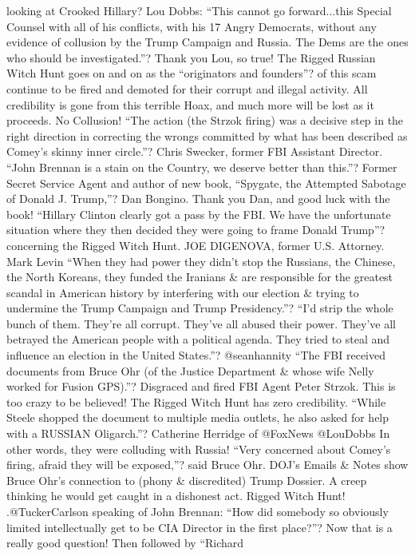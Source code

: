 looking at Crooked Hillary? Lou Dobbs: ``This cannot go forward...this
Special Counsel with all of his conflicts, with his 17 Angry Democrats,
without any evidence of collusion by the Trump Campaign and Russia. The
Dems are the ones who should be investigated.''? Thank you Lou, so true!
The Rigged Russian Witch Hunt goes on and on as the ``originators and
founders''? of this scam continue to be fired and demoted for their
corrupt and illegal activity. All credibility is gone from this terrible
Hoax, and much more will be lost as it proceeds. No Collusion! ``The
action (the Strzok firing) was a decisive step in the right direction in
correcting the wrongs committed by what has been described as Comey's
skinny inner circle.''? Chris Swecker, former FBI Assistant Director.
``John Brennan is a stain on the Country, we deserve better than
this.''? Former Secret Service Agent and author of new book, ``Spygate,
the Attempted Sabotage of Donald J. Trump,''? Dan Bongino. Thank you
Dan, and good luck with the book! ``Hillary Clinton clearly got a pass
by the FBI. We have the unfortunate situation where they then decided
they were going to frame Donald Trump''? concerning the Rigged Witch
Hunt. JOE DIGENOVA, former U.S. Attorney. Mark Levin ``When they had
power they didn't stop the Russians, the Chinese, the North Koreans,
they funded the Iranians \& are responsible for the greatest scandal in
American history by interfering with our election \& trying to undermine
the Trump Campaign and Trump Presidency.''? ``I'd strip the whole bunch
of them. They're all corrupt. They've all abused their power. They've
all betrayed the American people with a political agenda. They tried to
steal and influence an election in the United States.''? @seanhannity
``The FBI received documents from Bruce Ohr (of the Justice Department
\& whose wife Nelly worked for Fusion GPS).''? Disgraced and fired FBI
Agent Peter Strzok. This is too crazy to be believed! The Rigged Witch
Hunt has zero credibility. ``While Steele shopped the document to
multiple media outlets, he also asked for help with a RUSSIAN
Oligarch.''? Catherine Herridge of @FoxNews @LouDobbs In other words,
they were colluding with Russia! ``Very concerned about Comey's firing,
afraid they will be exposed,''? said Bruce Ohr. DOJ's Emails \& Notes
show Bruce Ohr's connection to (phony \& discredited) Trump Dossier. A
creep thinking he would get caught in a dishonest act. Rigged Witch
Hunt! .@TuckerCarlson speaking of John Brennan: ``How did somebody so
obviously limited intellectually get to be CIA Director in the first
place?''? Now that is a really good question! Then followed by ``Richard
